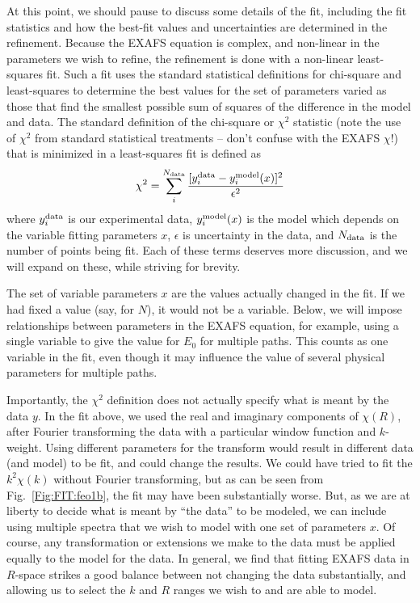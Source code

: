 At this point, we should pause to discuss some details of the fit,
including the fit statistics and how the best-fit values and uncertainties
are determined in the refinement.  Because the EXAFS equation is complex,
and non-linear in the parameters we wish to refine, the refinement is done
with a non-linear least-squares fit.    Such a fit uses the standard statistical
definitions for chi-square  and least-squares  to determine the
best values for the set of  parameters varied as those that find the
smallest possible sum of squares of the difference in the model and data.
The standard definition of the chi-square or $\chi^2$ statistic (note the
use of $\chi^2$ from standard statistical treatments -- don't confuse with
the EXAFS $\chi$!) that is minimized in a least-squares fit is defined as
\begin{equation}
  \chi^2  =  \sum_i^{N_{\rm data}} \frac{[y_i^{\rm data} - y_i^{\rm  model}({x})]^2}{\epsilon^2}
  \label{Eq:FIT:chisquare}
\end{equation}
\noindent where $y_i^{\rm data} $ is our experimental data, $y_i^{\rm
  model}({x})$ is the model which depends on the variable fitting
parameters $x$, $\epsilon$ is uncertainty in the data, and $N_{\rm data}$ is
the number of points being fit.  Each of
these terms deserves more discussion, and we will expand on these, while
striving for brevity.

The set of variable parameters $x$ are the values actually changed in the
fit.  If we had fixed a value (say, for $N$), it would not be a variable.
Below, we will impose relationships between parameters in the EXAFS
equation, for example, using a single variable to give the value for $E_0$ for
multiple paths.   This counts as one variable in the fit, even though it may
influence the value of several physical parameters for multiple paths.

Importantly, the $\chi^2$ definition does not actually specify what is
meant by the data $y$.  In the fit above, we used the real and imaginary
components of $\chi(R)$, after Fourier transforming the data with a
particular window function and $k$-weight.  Using different parameters for
the transform would result in different data (and model) to be fit, and
could change the results.  We could have tried to fit the $k^2\chi(k)$
without Fourier transforming, but as can be seen from
Fig.~\ref{Fig:FIT:feo1b}, the fit may have been substantially worse.  But,
as we are at liberty to decide what is meant by ``the data'' to be modeled,
we can include using multiple spectra that we wish to model with one set of
parameters $x$.  Of course, any transformation or extensions we make to the
data must be applied equally to the model for the data.   In general, we
find that fitting EXAFS data in $R$-space strikes a good balance between
not changing the data substantially, and allowing us to select the $k$ and
$R$ ranges we wish to and are able to model.

